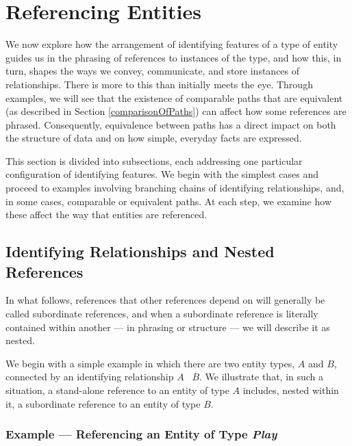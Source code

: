 
\newcommand{\BarkerEllisIdentiyingRelationship}{\barkerEllisJ}

\section{Referencing Entities}
\label{ReferencingEntities}

 We now explore how the arrangement of identifying features of a type of entity guides us in the phrasing of references to instances of the type, 
 and how this, in turn, shapes the ways we convey, communicate, and store instances of relationships.
There is more to this than initially meets the eye.
Through examples, we will see that the existence of comparable paths that are equivalent 
(as described in Section \ref{comparisonOfPaths}) can affect how  some references are phrased.
Consequently, equivalence between paths has a direct impact on both the structure of data and on how simple, everyday facts are expressed.

This section is divided into subsections, each addressing one particular configuration of identifying features.
We begin with the simplest cases and proceed to examples involving branching chains of identifying relationships, and, in some cases, comparable or equivalent paths.
At each step, we examine how these affect the way that entities are referenced.

\subsection{Identifying Relationships and Nested References}

In what follows, references that other references depend on will generally be called subordinate references, 
and when a subordinate reference is literally contained within another --- in phrasing or structure --- we will describe it as nested.

We begin with a simple example in which there are two entity types, $A$ and $B$, connected by an identifying relationship
$A$ \BarkerEllisIdentiyingRelationship\ $B$.
We illustrate that, in such a situation, a stand-alone reference to an entity of type $A$ includes, nested within it, a subordinate reference to an entity of type $B$.

\subsubsection{Example — Referencing an Entity of Type \textit{Play}}

